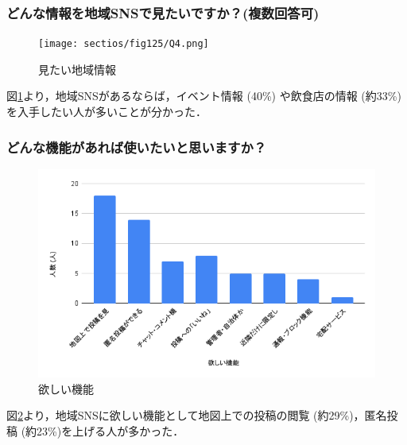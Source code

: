 \subsubsection{どんな情報を地域SNSで見たいですか？(複数回答可)}
\begin{figure}[H]
    \centering
    \texttt{[image: sectios/fig125/Q4.png]}
    \caption{見たい地域情報}
    \label{fig:Q4}
\end{figure}
図\ref{fig:Q4}より，地域SNSがあるならば，イベント情報 (40\%) や飲食店の情報 (約33\%)を入手したい人が多いことが分かった．

\subsubsection{どんな機能があれば使いたいと思いますか？}
\begin{figure}[H]
    \centering
    \includegraphics[width=0.5\linewidth]{sections/fig125/Q7.png}
    \caption{欲しい機能}
    \label{fig:Q7}
\end{figure}
図\ref{fig:Q7}より，地域SNSに欲しい機能として地図上での投稿の閲覧 (約29\%)，匿名投稿 (約23\%)を上げる人が多かった．

